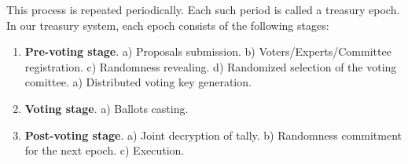 This process is repeated periodically. Each such period is called a treasury epoch. In our treasury system, each epoch consists of the following stages:
\begin{enumerate}[leftmargin=5em, itemsep=0em]
    \item \textbf{Pre-voting stage}.
        \subitem a) Proposals submission.
        \subitem b) Voters/Experts/Committee registration.
        \subitem c) Randomness revealing.
        \subitem d) Randomized selection of the voting comittee.
        \subitem a) Distributed voting key generation.
    \item \textbf{Voting stage}.
        \subitem a) Ballots casting.
    \item \textbf{Post-voting stage}.
        \subitem a) Joint decryption of tally.
        \subitem b) Randomness commitment for the next epoch.
        \subitem c) Execution.
\end{enumerate}

